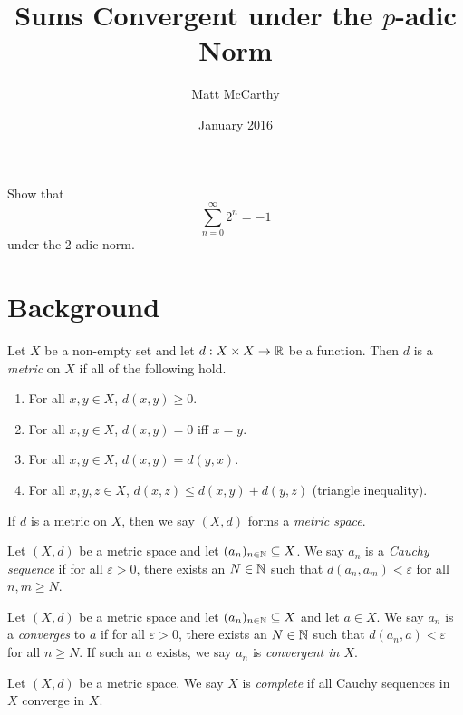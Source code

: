 \documentclass[notitlepage]{problem-solving}
\title{Sums Convergent under the $p$-adic Norm}
\date{January 2016}
\author{Matt McCarthy}
\begin{document}
\maketitle

\begin{problem*}
	Show that
	\[
		\sum_{n=0}^\infty 2^n = -1
	\]
	under the 2-adic norm.
\end{problem*}

\section{Background}

\begin{definition}
	Let $X$ be a non-empty set and let $d:X\times X\rightarrow \mathbb{R}$ be a function.
	Then $d$ is a \textit{metric} on $X$ if all of the following hold.
	\begin{enumerate}
		\item For all $x,y\in X$, $d(x,y)\geq 0$.
		\item For all $x,y\in X$, $d(x,y) = 0$ iff $x=y$.
		\item For all $x,y\in X$, $d(x,y)=d(y,x)$.
		\item For all $x,y,z\in X$, $d(x,z)\leq d(x,y)+d(y,z)$ (triangle inequality).
	\end{enumerate}
	If $d$ is a metric on $X$, then we say $(X,d)$ forms a \textit{metric space}.
\end{definition}

\begin{definition}
	Let $(X,d)$ be a metric space and let $(a_n)_{n\in\mathbb{N}}\subseteq X$.
	We say $a_n$ is a \textit{Cauchy sequence} if for all $\varepsilon>0$, there exists an $N\in\mathbb{N}$ such that $d(a_n,a_m)<\varepsilon$ for all $n,m\geq N$.
\end{definition}

\begin{definition}
	Let $(X,d)$ be a metric space and let $(a_n)_{n\in\mathbb{N}}\subseteq X$ and let $a\in X$.
	We say $a_n$ is a \textit{converges} to $a$ if for all $\varepsilon>0$, there exists an $N\in\mathbb{N}$ such that $d(a_n,a)<\varepsilon$ for all $n\geq N$.
	If such an $a$ exists, we say $a_n$ is \textit{convergent in $X$}.
\end{definition}

\begin{definition}
	Let $(X,d)$ be a metric space.
	We say $X$ is \textit{complete} if all Cauchy sequences in $X$ converge in $X$.
\end{definition}
\end{document}
